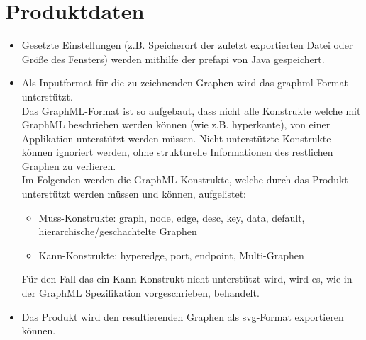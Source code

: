 \chapter{Produktdaten}\label{ch:daten}

\begin{itemize}
  \item Gesetzte Einstellungen (z.B. Speicherort der zuletzt exportierten Datei oder Größe des Fensters) werden mithilfe der \gls{prefapi} von Java gespeichert.
  \item Als Inputformat für die zu zeichnenden Graphen wird das \gls{graphml}-Format unterstützt.\\
    Das GraphML-Format ist so aufgebaut, dass nicht alle Konstrukte welche mit GraphML beschrieben werden können (wie z.B. \gls{hyperkante}),
    von einer Applikation unterstützt werden müssen.
    Nicht unterstützte Konstrukte können ignoriert werden, ohne strukturelle Informationen des restlichen Graphen zu verlieren.\\
    Im Folgenden werden die GraphML-Konstrukte, welche durch das Produkt unterstützt werden müssen und können, aufgelistet:
    \begin{itemize}
      \item Muss-Konstrukte: graph, node, edge, desc, key, data, default, hierarchische/geschachtelte Graphen  %
      \item Kann-Konstrukte: hyperedge, port, endpoint, Multi-Graphen
    \end{itemize}
    Für den Fall das ein Kann-Konstrukt nicht unterstützt wird, wird es, wie in der GraphML Spezifikation vorgeschrieben, behandelt.
  \item Das Produkt wird den resultierenden Graphen als \gls{svg}-Format exportieren können.
\end{itemize}

